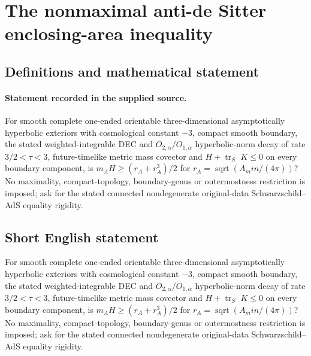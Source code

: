 \documentclass[11pt]{article}
\begin{document}
\section*{The nonmaximal anti-de Sitter enclosing-area inequality}\label{30007239}
\subsection{Definitions and mathematical statement}
\paragraph{Statement recorded in the supplied source.}
For smooth complete one-ended orientable three-dimensional asymptotically hyperbolic exteriors with cosmological constant $-3$, compact smooth boundary, the stated weighted-integrable DEC and $O_{2,\alpha }/O_{1,\alpha }$ hyperbolic-norm decay of rate $3/2<\tau <3$, future-timelike metric mass covector and $H+\operatorname{tr}_S$ $K\leq 0$ on every boundary component, is $m_AH\geq (r_A+r_A^3)/2$ for $r_A=\operatorname{sqrt}(A_min/(4\pi ))$? No maximality, compact-topology, boundary-genus or outermostness restriction is imposed; ask for the stated connected nondegenerate original-data Schwarzschild–AdS equality rigidity.
\subsection{Short English statement}
For smooth complete one-ended orientable three-dimensional asymptotically hyperbolic exteriors with cosmological constant $-3$, compact smooth boundary, the stated weighted-integrable DEC and $O_{2,\alpha }/O_{1,\alpha }$ hyperbolic-norm decay of rate $3/2<\tau <3$, future-timelike metric mass covector and $H+\operatorname{tr}_S$ $K\leq 0$ on every boundary component, is $m_AH\geq (r_A+r_A^3)/2$ for $r_A=\operatorname{sqrt}(A_min/(4\pi ))$? No maximality, compact-topology, boundary-genus or outermostness restriction is imposed; ask for the stated connected nondegenerate original-data Schwarzschild–AdS equality rigidity.
\end{document}
